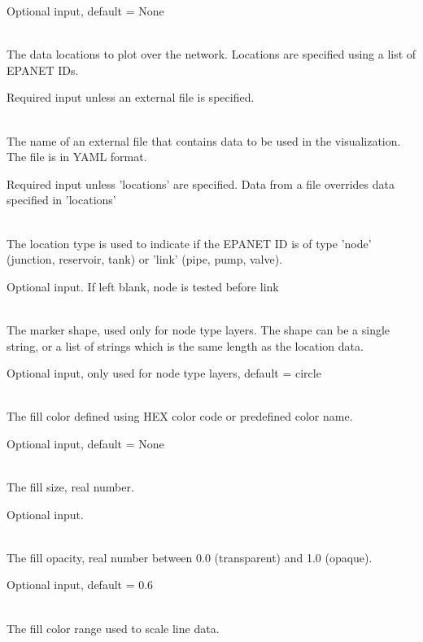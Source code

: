 \begin{description}[topsep=0pt,parsep=0.5em,itemsep=-0.4em]
\begin{description}[topsep=0pt,parsep=0.5em,itemsep=-0.4em]
\begin{description}[topsep=0pt,parsep=0.5em,itemsep=-0.4em]
                Optional input, default = None
      \item[{locations}]\hfill
\\
                The data locations to plot over the network. Locations are specified
                using a list of EPANET IDs.
                
                Required input unless an external file is specified.
      \item[{file}]\hfill
\\The name of an external file that contains data to be used in the visualization.
                The file is in YAML format. 
                
                Required input unless 'locations' are specified.  
                Data from a file overrides data specified in 'locations'
      \item[{location type}]\hfill
\\The location type is used to indicate if the EPANET ID is of type 'node' 
                (junction, reservoir, tank) or 'link' (pipe, pump, valve).
                
                Optional input. If left blank, node is tested before link
      \item[{shape}]\hfill
\\The marker shape, used only for node type layers. The shape can
                be a single string, or a list of strings which is the same 
                length as the location data.
                
				Optional input, only used for node type layers, default = circle
      \item[{fill}]\hfill
      \begin{description}[topsep=0pt,parsep=0.5em,itemsep=-0.4em]
        \item[{color}]\hfill
\\The fill color defined using HEX color code or predefined color name.
                
                Optional input, default = None
        \item[{size}]\hfill
\\The fill size, real number.
                
                Optional input.
        \item[{opacity}]\hfill
\\The fill opacity, real number between 0.0 (transparent) and 1.0 (opaque).
                
                Optional input, default = 0.6
        \item[{color range}]\hfill
\\The fill color range used to scale line data.
                

\end{description}
\end{description}
\end{description}
\end{description}
